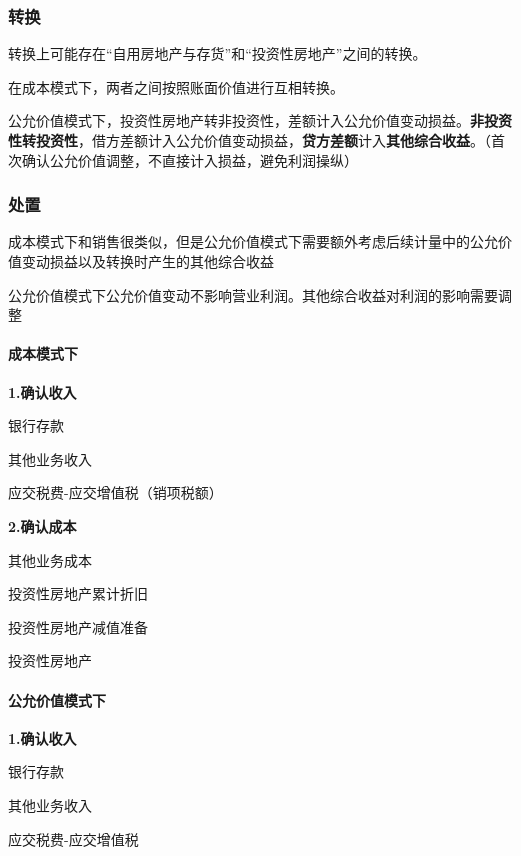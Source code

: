 \documentclass[UTF8,12pt]{ctexart}
\newenvironment{Dr}{%
	\begin{list}{}%
		{
			\setlength{\leftmargin}{2em}
			\setlength{\labelwidth}{2em}
			\setlength{\labelsep}{0pt}
			\setlength{\itemindent}{0pt}
			\setlength{\listparindent}{0pt}
			\setlength{\parsep}{0pt}
			\setlength{\topsep}{0pt}
		}
		\item[\textbf{借：}]
	}{%
	\end{list}
}
\newenvironment{Cr}{%
	\begin{list}{}%
		{
			\setlength{\leftmargin}{3em}
			\setlength{\labelwidth}{2em}
			\setlength{\labelsep}{0pt}
			\setlength{\itemindent}{0pt}
			\setlength{\listparindent}{0pt}
			\setlength{\parsep}{0pt}
			\setlength{\topsep}{0pt}
		}
		\item[\textbf{贷：}]
	}{%
	\end{list}
}
\numberwithin{equation}{section} %
\numberwithin{figure}{section}
\numberwithin{table}{section}
\begin{document}
	\subsubsection{转换}
	转换上可能存在“自用房地产与存货”和“投资性房地产”之间的转换。
	
	在成本模式下，两者之间按照账面价值进行互相转换。
	
	公允价值模式下，投资性房地产转非投资性，差额计入公允价值变动损益。\textbf{非投资性转投资性}，借方差额计入公允价值变动损益，\textbf{贷方差额}计入\textbf{其他综合收益}。（首次确认公允价值调整，不直接计入损益，避免利润操纵）
	
	\subsubsection{处置}
	成本模式下和销售很类似，但是公允价值模式下需要额外考虑后续计量中的公允价值变动损益以及转换时产生的其他综合收益
	
	公允价值模式下公允价值变动不影响营业利润。其他综合收益对利润的影响需要调整
	
	
	\paragraph{成本模式下}
	
	\textbf{1.确认收入}
	
	\begin{Dr}
		银行存款
	\end{Dr}
	\begin{Cr}
		其他业务收入
		
		应交税费-应交增值税（销项税额）
	\end{Cr}

	
	\textbf{2.确认成本}
	
	\begin{Dr}
		其他业务成本
		
		投资性房地产累计折旧
		
		投资性房地产减值准备
	\end{Dr}
	\begin{Cr}
		投资性房地产
	\end{Cr}

	
	\paragraph{公允价值模式下}
	\textbf{1.确认收入}
	
	\begin{Dr}
		银行存款
	\end{Dr}
	\begin{Cr}
		其他业务收入
		
		应交税费-应交增值税
	\end{Cr}
	
\end{document}
